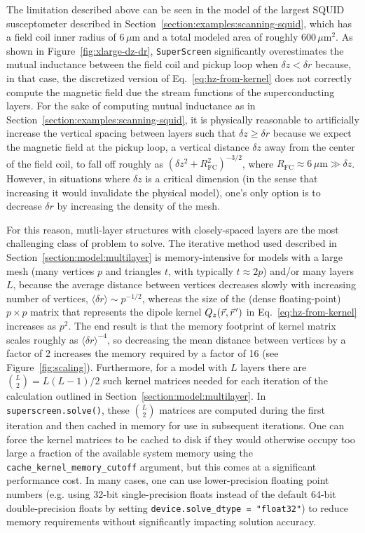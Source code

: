 \documentclass[final,3p,times,twocolumn]{elsarticle}
\newcommand{\pvec}[1]{\vec{#1}\mkern2mu\vphantom{#1}}
\newcommand{\inline}[1]{\texttt{#1}\xspace}
\newcommand{\SuperScreen}{\inline{SuperScreen}}
\newcommand{\um}{\mu\mathrm{m}}
\begin{document}
The limitation described above can be seen in the model of the largest SQUID susceptometer described in Section~\ref{section:examples:scanning-squid}, which has a field coil inner radius of $6\,\um$ and a total modeled area of roughly $600\,\um^2$. As shown in Figure~\ref{fig:xlarge-dz-dr}, \SuperScreen significantly overestimates the mutual inductance between the field coil and pickup loop when $\delta z <\delta r$ because, in that case, the discretized version of Eq.~\ref{eq:hz-from-kernel} does not correctly compute the magnetic field due the stream functions of the superconducting layers. For the sake of computing mutual inductance as in Section~\ref{section:examples:scanning-squid}, it is physically reasonable to artificially increase the vertical spacing between layers such that $\delta z\geq \delta r$ because we expect the magnetic field at the pickup loop, a vertical distance $\delta z$ away from the center of the field coil, to fall off roughly as $\left(\delta z^2 + R^2_\mathrm{FC}\right)^{-3/2}$, where $R_\mathrm{FC}\approx 6\,\um\gg\delta z$. However, in situations where $\delta z$ is a critical dimension (in the sense that increasing it would invalidate the physical model), one's only option is to decrease $\delta r$ by increasing the density of the mesh.

For this reason, mutli-layer structures with closely-spaced layers are the most challenging class of problem to solve. The iterative method used described in Section~\ref{section:model:multilayer} is memory-intensive for models with a large mesh (many vertices $p$ and triangles $t$, with typically $t\approx 2p$) and/or many layers $L$, because the average distance between vertices decreases slowly with increasing number of vertices, $\langle\delta r\rangle\sim p^{-1/2}$, whereas the size of the (dense floating-point) $p\times p$ matrix that represents the dipole kernel $Q_z(\vec{r},\pvec{r}')$ in Eq.~\ref{eq:hz-from-kernel} increases as $p^2$. The end result is that the memory footprint of kernel matrix scales roughly as $\langle\delta r\rangle^{-4}$, so decreasing the mean distance between vertices by a factor of 2 increases the memory required by a factor of 16 (see Figure~\ref{fig:scaling}). Furthermore, for a model with $L$ layers there are $\binom{L}{2} = L(L-1)/2$ such kernel matrices needed for each iteration of the calculation outlined in Section~\ref{section:model:multilayer}. In \inline{superscreen.solve()}, these $\binom{L}{2}$ matrices are computed during the first iteration and then cached in memory for use in subsequent iterations. One can force the kernel matrices to be cached to disk if they would otherwise occupy too large a fraction of the available system memory using the \inline{cache_kernel_memory_cutoff} argument, but this comes at a significant performance cost. In many cases, one can use lower-precision floating point numbers (e.g. using 32-bit single-precision floats instead of the default 64-bit double-precision floats by setting \inline{device.solve_dtype = "float32"}) to reduce memory requirements without significantly impacting solution accuracy.
\end{document}
